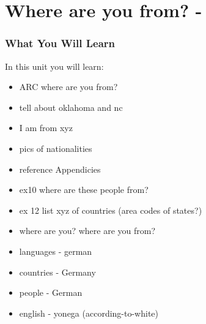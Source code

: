 \chapter*{Where are you from? - }
\subsection{What You Will Learn}
In this unit you will learn:
\begin{itemize}
\item ARC where are you from?
\item tell about oklahoma and nc
\item I am from xyz
\item pics of nationalities
\item reference Appendicies
\item ex10 where are these people from?
\item ex 12 list xyz of countries (area codes of states?)
\item where are you?  where are you from?
\item languages - german
\item countries - Germany
\item people - German
\item english - yonega (according-to-white)
\end{itemize}\newpage


